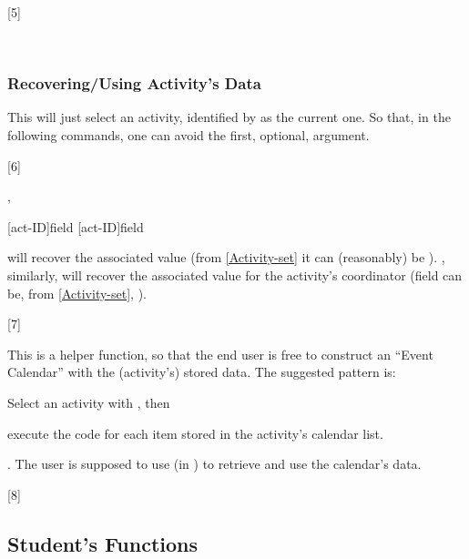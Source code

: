 \documentclass[10pt]{article}
\begin{document}
[5]

~

\subsubsection{Recovering/Using Activity's Data}

\begin{codedescribe}{\ActivitySelect}
  \begin{codesyntax}
  \end{codesyntax}
  This will just select an activity, identified by  as the current one. So that, in the following commands, one can avoid the first, optional, argument.
\end{codedescribe}


[6]


\begin{codedescribe}{\Activity,\ActivityCoord}
\begin{codesyntax}
  \tsmacro{\Activity}[act-ID]{field}
  \tsmacro{\ActivityCoord}[act-ID]{field}
\end{codesyntax}
  \tsobj{\Activity} will recover the associated  value (from \ref{Activity-set} it can (reasonably) be ).
  \tsobj{\ActivityCoord}, similarly, will recover the associated  value for the activity's coordinator (field can be, from \ref{Activity-set},  ).
\end{codedescribe}

[7]

\begin{codedescribe}{\ActivityCalendarIterate}
  \begin{codesyntax}
  \end{codesyntax}
  This is a helper function, so that the end user is free to construct an ``Event Calendar'' with the (activity's) stored data. The suggested pattern is: 
  \begin{enumerate*}
    \item Select an activity with \tsobj{\ActivitySelect}, then
    \item execute the code for each item stored in the activity's calendar list.
  \end{enumerate*}. The user is supposed to use (in ) \tsobj[code,sep=or]{\DataField,\DataGet} to retrieve and use the calendar's data.
\end{codedescribe}

[8]


\subsection{Student's Functions}
\end{document}
